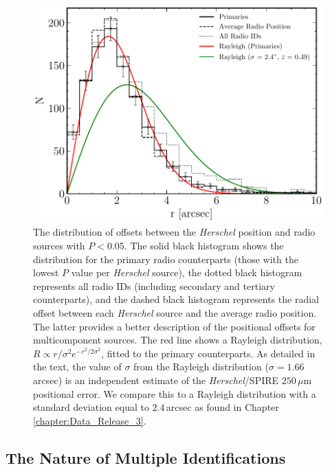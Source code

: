 \begin{figure}
	\centering
	\includegraphics[width=0.8\columnwidth]{Figures/Figure_5_5.pdf}
	\caption[Distribution of radial offsets between \textit{Herschel} sources and radio IDs]{The distribution of offsets between the \textit{Herschel} position and radio sources with $P < 0.05$. The solid black histogram shows the distribution for the primary radio counterparts (those with the lowest $P$ value per \textit{Herschel} source), the dotted black histogram represents all radio IDs (including secondary and tertiary counterparts), and the dashed black histogram represents the radial offset between each \textit{Herschel} source and the average radio position. The latter provides a better description of the positional offsets for multicomponent sources. The red line shows a Rayleigh distribution, $R \propto r/\sigma^2 e^{-r^2/2\sigma^2}$, fitted to the primary counterparts. As detailed in the text, the value of $\sigma$ from the Rayleigh distribution ($\sigma = 1.66\,$arcsec) is an independent estimate of the \textit{Herschel}/SPIRE $250\,\mu$m positional error. We compare this to a Rayleigh distribution with a standard deviation equal to $2.4\,$arcsec as found in Chapter \ref{chapter:Data_Release_3}.}
	\label{fig:source_counterpart_offset}
\end{figure}

\subsection{The Nature of Multiple Identifications}
\label{sec:multiple_systems}

